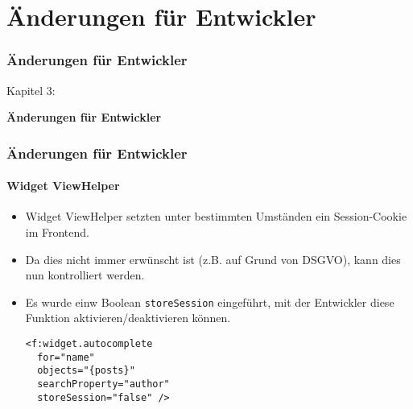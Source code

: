 %

\section{Änderungen für Entwickler}
\begin{frame}[fragile]
	\frametitle{Änderungen für Entwickler}

	\begin{center}\huge{Kapitel 3:}\end{center}
	\begin{center}\huge{\color{typo3darkgrey}\textbf{Änderungen für Entwickler}}\end{center}

\end{frame}


\begin{frame}[fragile]
	\frametitle{Änderungen für Entwickler}
	\framesubtitle{Widget ViewHelper}

	\lstset{basicstyle=\smaller\ttfamily}

	\begin{itemize}
		\item Widget ViewHelper setzten unter bestimmten Umständen ein Session-Cookie im Frontend.
		\item Da dies nicht immer erwünscht ist (z.B. auf Grund von DSGVO), kann dies nun kontrolliert werden.
		\item Es wurde einw Boolean \texttt{storeSession} eingeführt, mit der Entwickler diese Funktion aktivieren/deaktivieren können.
\begin{lstlisting}
<f:widget.autocomplete
  for="name"
  objects="{posts}"
  searchProperty="author"
  storeSession="false" />
\end{lstlisting}

	\end{itemize}

\end{frame}


